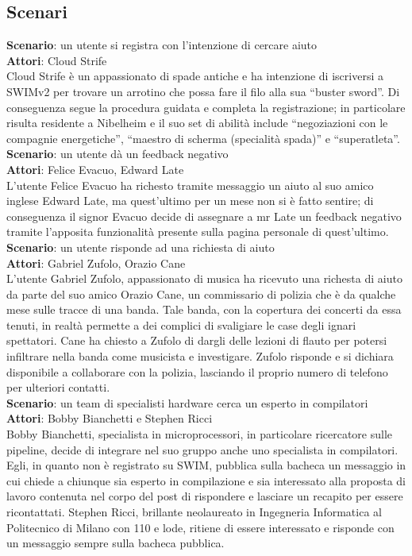 \documentclass[a4paper,12pt]{article}
\begin{document}
\subsection{Scenari}
\textbf{Scenario}: un utente si registra con l'intenzione di cercare aiuto \\
\textbf{Attori}: Cloud Strife \\
Cloud Strife è un appassionato di spade antiche e ha intenzione di iscriversi a SWIMv2 per trovare un arrotino che possa fare il filo alla sua “buster sword”. Di conseguenza segue la procedura guidata  e completa la registrazione; in particolare risulta residente a Nibelheim e il suo set di abilità include “negoziazioni con le compagnie energetiche”, “maestro di scherma (specialità spada)” e “superatleta”. \\[1em]
\textbf{Scenario}: un utente dà un feedback negativo \\
\textbf{Attori}: Felice Evacuo, Edward Late \\
L'utente Felice Evacuo ha richesto tramite messaggio un aiuto al suo amico inglese Edward Late, ma quest'ultimo per un mese non si è fatto sentire; di conseguenza il signor Evacuo decide di assegnare a mr Late un feedback negativo tramite l'apposita funzionalità presente sulla pagina personale di quest'ultimo. \\[1em]
\textbf{Scenario}: un utente risponde ad una richiesta di aiuto \\
\textbf{Attori}: Gabriel Zufolo, Orazio Cane \\
L'utente Gabriel Zufolo, appassionato di musica ha ricevuto una richesta di aiuto da parte del suo amico Orazio Cane, un commissario di polizia che è da qualche mese sulle tracce di una banda. Tale banda, con la copertura dei concerti da essa tenuti, in realtà permette a dei complici di svaligiare le case degli ignari spettatori. Cane ha chiesto a Zufolo di dargli delle lezioni di flauto per potersi infiltrare nella banda come musicista e investigare. Zufolo risponde e si dichiara disponibile a collaborare con la polizia, lasciando il proprio numero di telefono per ulteriori contatti. \\[1em]
\textbf{Scenario}: un team di specialisti hardware cerca un esperto in compilatori \\
\textbf{Attori}: Bobby Bianchetti e Stephen Ricci \\
Bobby Bianchetti, specialista in microprocessori, in particolare ricercatore sulle pipeline, decide di integrare nel suo gruppo anche uno specialista in compilatori. Egli, in quanto non è registrato su SWIM, pubblica sulla bacheca un messaggio in cui chiede a chiunque sia esperto in compilazione e sia interessato alla proposta di lavoro contenuta nel corpo del post di rispondere e lasciare un recapito per essere ricontattati. Stephen Ricci, brillante neolaureato in Ingegneria Informatica al Politecnico di Milano con 110 e lode, ritiene di essere interessato e risponde con un messaggio sempre sulla bacheca pubblica.  \\[1em]
\end{document}
